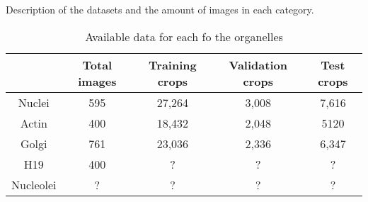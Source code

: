 Description of the datasets and the amount of images in each category.

\begin{table}[H]
    \centering
    \caption{Available data for each fo the organelles}
        \begin{adjustbox}{width=0.7\textwidth}
            \begin{tabular}{|c||c|c|c|c|}\hline
                &Total images
                &Training crops
                &Validation crops
                &Test crops
                \\\hline\hline
                Nuclei &595&27,264&3,008&7,616\\\hline
                Actin &400&18,432&2,048&5120\\\hline
                Golgi &761&23,036&2,336&6,347\\\hline
                H19 &400&?&?&?\\\hline
                Nucleolei &?&?&?&?\\\hline
            \end{tabular}
        \end{adjustbox}
\end{table}
